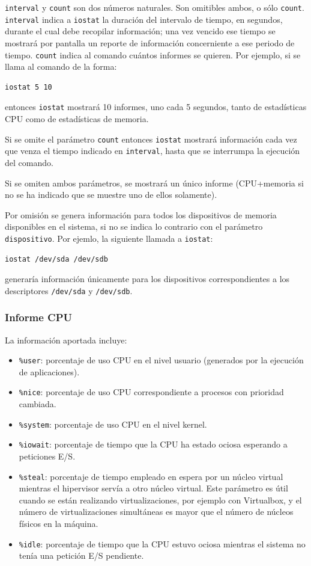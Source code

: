 \documentclass[a4paper,10pt]{article}
\begin{document}
\texttt{interval} y \texttt{count} son dos números naturales. Son omitibles ambos, o sólo \texttt{count}. \texttt{interval} indica
a \texttt{iostat} la duración del intervalo de tiempo, en segundos, durante el cual debe recopilar información; una vez vencido
ese tiempo se mostrará por pantalla un reporte de información concerniente a ese periodo de tiempo. \texttt{count} indica al comando
cuántos informes se quieren. Por ejemplo, si se llama al comando de la forma:

\begin{lstlisting}[style=BashInputStyle]
  iostat 5 10
\end{lstlisting}
  
entonces \texttt{iostat} mostrará 10 informes, uno cada 5 segundos, tanto de estadísticas CPU como de estadísticas de memoria.

Si se omite el parámetro \texttt{count} entonces \texttt{iostat} mostrará información cada vez que venza el tiempo indicado en \texttt{interval},
hasta que se interrumpa la ejecución del comando.

Si se omiten ambos parámetros, se mostrará un único informe (CPU+memoria si no se ha indicado que se muestre uno de ellos solamente).

Por omisión se genera información para todos los dispositivos de memoria disponibles en el sistema, si no se indica lo contrario
con el parámetro \texttt{dispositivo}. Por ejemlo, la siguiente llamada a \texttt{iostat}:

\begin{lstlisting}[style=BashInputStyle]
  iostat /dev/sda /dev/sdb
\end{lstlisting}

generaría información únicamente para los dispositivos correspondientes a los descriptores \texttt{/dev/sda} y \texttt{/dev/sdb}.

\subsubsection{Informe CPU}
La información aportada incluye:
\begin{itemize}
 \item \texttt{\%user}: porcentaje de uso CPU en el nivel usuario (generados por la ejecución de aplicaciones).
 \item \texttt{\%nice}: porcentaje de uso CPU correspondiente a procesos con prioridad cambiada.
 \item \texttt{\%system}: porcentaje de uso CPU en el nivel kernel.
 \item \texttt{\%iowait}: porcentaje de tiempo que la CPU ha estado ociosa esperando a peticiones E/S.
 \item \texttt{\%steal}: porcentaje de tiempo empleado en espera por un núcleo virtual mientras el hipervisor servía a otro
 núcleo virtual. Este parámetro es útil cuando se están realizando virtualizaciones, por ejemplo con Virtualbox, y el número de
 virtualizaciones simultáneas es mayor que el número de núcleos físicos en la máquina.
 \item \texttt{\%idle}: porcentaje de tiempo que la CPU estuvo ociosa mientras el sistema no tenía una petición E/S pendiente.
\end{itemize}
\end{document}
